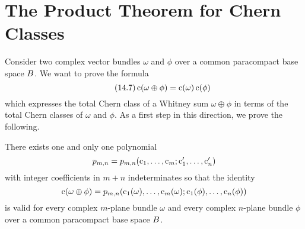 \documentclass[../main]{subfiles}
\begin{document}
\section{The Product Theorem for Chern Classes}
Consider two complex vector bundles $\omega$ and $\phi$ over a common paracompact base space $B$. We want to prove the formula
\[\tag{14.7}\label{eqn:14.07}
\operatorname{c}(\omega \oplus \phi)=\operatorname{c}(\omega) \operatorname{c}(\phi)
\]
which expresses the total Chern class of a Whitney sum $\omega \oplus \phi$ in terms of the total Chern classes of $\omega$ and $\phi$. As a first step in this direction, we prove the following.

\setcounter{theorem}{7}
\begin{lemma}\label{lem:14.08}
 There exists one and only one polynomial
\[
p_{m, n}=p_{m, n}(\operatorname{c}_{1}, \ldots, \operatorname{c}_{m} ; \operatorname{c}_{1}^{\prime}, \ldots, \operatorname{c}_{n}^{\prime})
\]
with integer coefficients in $m+n$ indeterminates so that the identity
\[
\operatorname{c}(\omega \oplus \phi)=p_{m, n}(\operatorname{c}_{1}(\omega), \ldots, \operatorname{c}_{m}(\omega) ; \operatorname{c}_{1}(\phi), \ldots, \operatorname{c}_{n}(\phi))
\]
is valid for every complex $m$-plane bundle $\omega$ and every complex $n$-plane bundle $\phi$ over a common paracompact base space $B$.
\end{lemma}
\end{document}

